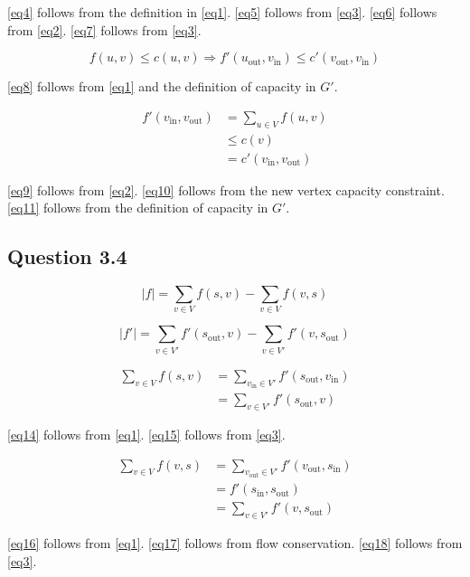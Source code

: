 \documentclass{sig-alternate}
\begin{document}
\autoref{eq4} follows from the definition in \autoref{eq1}. \autoref{eq5}
follows from \autoref{eq3}. \autoref{eq6} follows from \autoref{eq2}.
\autoref{eq7} follows from \autoref{eq3}.

\begin{equation}
    \label{eq8} f(u,v) \leq c(u,v) \Rightarrow f'(u_{\text{out}}, v_{\text{in}}) \leq c'(v_{\text{out}}, v_{\text{in}})
\end{equation}

\autoref{eq8} follows from \autoref{eq1} and the definition of capacity in $G'$.

\begin{align}
    \label{eq9} f'(v_{\text{in}}, v_{\text{out}}) &= \sum_{u\in V} f(u, v) \\
    \label{eq10}    &\leq c(v) \\
    \label{eq11}    &= c'(v_{\text{in}}, v_{\text{out}})
\end{align}

\autoref{eq9} follows from \autoref{eq2}. \autoref{eq10} follows from the new
vertex capacity constraint. \autoref{eq11} follows from the definition of
capacity in $G'$.

\subsection*{Question 3.4}

\begin{equation}
    |f| = \sum_{v \in V} f(s,v) - \sum_{v \in V} f(v,s)
\end{equation}

\begin{equation}
    |f'| = \sum_{v \in V'} f'(s_{\text{out}},v) - \sum_{v \in V'} f'(v,s_{\text{out}})
\end{equation}

\begin{align}
    \label{eq14} \sum_{v \in V} f(s, v) &= \sum_{v_{\text{in}} \in V'} f'(s_{\text{out}}, v_{\text{in}}) \\
    \label{eq15}    &= \sum_{v \in V'} f'(s_{\text{out}}, v)
\end{align}

\autoref{eq14} follows from \autoref{eq1}. \autoref{eq15} follows from \autoref{eq3}.

\begin{align}
    \label{eq16} \sum_{v \in V} f(v, s) &= \sum_{v_{\text{out}} \in V'} f'(v_{\text{out}}, s_{\text{in}}) \\
    \label{eq17}    &= f'(s_{\text{in}}, s_{\text{out}}) \\
    \label{eq18}    &= \sum_{v \in V'} f'(v, s_{\text{out}})
\end{align}

\autoref{eq16} follows from \autoref{eq1}. \autoref{eq17} follows from flow
conservation. \autoref{eq18} follows from \autoref{eq3}.


\end{document}
